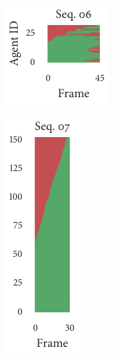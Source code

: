\begin{figure}[t]
	\begin{subfigure}[b]{0.2\textwidth}
		\centering
		\includegraphics{missingness_sequence06.pdf}
	\end{subfigure}%
	\begin{subfigure}[b]{0.2\textwidth}
		\centering
		\includegraphics{missingness_sequence07.pdf}
	\end{subfigure}%
	\begin{subfigure}[b]{0.2\textwidth}
		\centering

\end{subfigure}
\end{figure}

